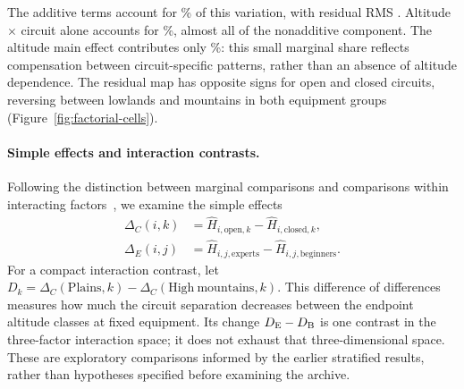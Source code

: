 \begin{table}[htbp]
 \centering\small
 
 \caption{Experimental partition of variation among the 16 fitted exponents,
 using equal cell weights. The degrees of freedom give subspace dimensions;
 no mean-square error or $F$ test is constructed. RMS values have the units of
 $H$. Small shares do not establish the absence of an interaction.}
 \label{tab:factorial-decomposition}
\end{table}

The additive terms account for \FactorialAddPct\% of this variation, with
residual RMS \FactorialResidualRms{}. Altitude $\times$ circuit alone accounts
for \FactorialAcPct\%, almost all of the nonadditive component. The altitude
main effect contributes only \FactorialAltPct\%: this small marginal share
reflects compensation between circuit-specific patterns, rather than an
absence of altitude dependence. The residual map has opposite signs for open
and closed circuits, reversing between lowlands and mountains in both equipment
groups (Figure~\ref{fig:factorial-cells}).

\paragraph{Simple effects and interaction contrasts.}
Following the distinction between marginal comparisons and comparisons within
interacting factors~\cite[Section~9.4]{mohr2022statistical}, we examine the
simple effects
\begin{equation}
 \begin{aligned}
 \Delta_C(i,k)&=\widehat H_{i,\mathrm{open},k}
                 -\widehat H_{i,\mathrm{closed},k},\\
 \Delta_E(i,j)&=\widehat H_{i,j,\mathrm{experts}}
                 -\widehat H_{i,j,\mathrm{beginners}}.
 \end{aligned}
 \label{eq:factorial-simple}
\end{equation}
For a compact interaction contrast, let
$D_k=\Delta_C(\mathrm{Plains},k)-\Delta_C(\mathrm{High\ mountains},k)$.
This difference of differences measures how much the circuit separation
decreases between the endpoint altitude classes at fixed equipment. Its change
$D_{\rm E}-D_{\rm B}$ is one contrast in the three-factor interaction space;
it does not exhaust that three-dimensional space. These are exploratory
comparisons informed by the earlier stratified results, rather than hypotheses
specified before examining the archive.

